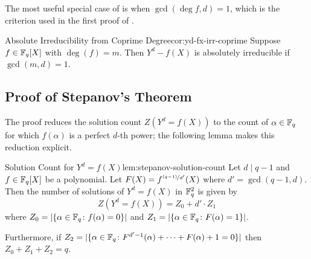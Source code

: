 The most useful special case of \YdFxIrrthm is when $\gcd(\deg f, d)=1$, which is the criterion used in the first proof of \Stepanov.
\begin{corolary}{Absolute Irreducibility from Coprime Degree}{cor:yd-fx-irr-coprime}
  Suppose $f\in\mathbb{F}_q[X]$ with $\deg(f)=m$. Then $Y^d-f(X)$ is absolutely irreducible if $\gcd(m,d)=1$.
\end{corolary}

\subsection{Proof of Stepanov's Theorem}
The proof reduces the solution count $Z(Y^d=f(X))$ to the count of $\alpha\in\mathbb{F}_q$ for which $f(\alpha)$ is a perfect $d$-th power; the following lemma makes this reduction explicit.
\begin{lemma}{Solution Count for $Y^d=f(X)$}{lem:stepanov-solution-count}
  Let $d\mid q-1$ and $f\in \mathbb{F}_q[X]$ be a polynomial. Let $F(X)=f^{\nicefrac{(q-1)}{d'}}(X)$ where $d'=\gcd(q-1,d)$. Then the number of solutions of $Y^d=f(X)$ in $\mathbb{F}_q^2$ is given by 
  $$Z(Y^d=f(X))=Z_0+d'\cdot Z_1$$ where $Z_0=|\{\alpha\in\mathbb{F}_q\colon f(\alpha)=0\}|$ and $Z_1=|\{\alpha\in\mathbb{F}_q\colon F(\alpha)=1\}|$.

  Furthermore, if $Z_2=|\{\alpha\in\mathbb{F}_q\colon F^{d'-1}(\alpha)+\cdots +F(\alpha)+1=0\}|$ then $Z_0+Z_1+Z_2=q$.
\end{lemma}
